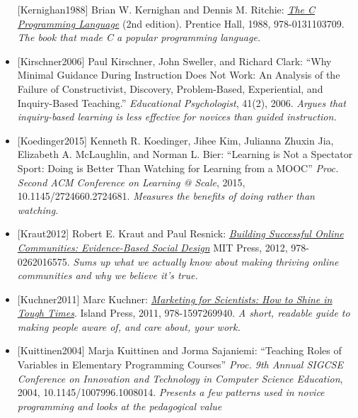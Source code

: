\documentclass[10pt,statementpaper]{memoir}
\begin{document}
\begin{itemize}
  \protect\hypertarget{kernighan-ritchie-c}{}{{[}Kernighan1988{]}} Brian
  W. Kernighan and Dennis M. Ritchie:
  \emph{\href{https://www.amazon.com/Programming-Language-Brian-W-Kernighan/dp/0131103628/}{The
  C Programming Language}} (2nd edition). Prentice Hall, 1988,
  978-0131103709. \emph{The book that made C a popular programming
  language.}
\item
  \protect\hypertarget{kirschner-minimal}{}{{[}Kirschner2006{]}} Paul
  Kirschner, John Sweller, and Richard Clark: ``Why Minimal Guidance
  During Instruction Does Not Work: An Analysis of the Failure of
  Constructivist, Discovery, Problem-Based, Experiential, and
  Inquiry-Based Teaching.'' \emph{Educational Psychologist}, 41(2),
  2006. \emph{Argues that inquiry-based learning is less effective for
  novices than guided instruction.}
\item
  \protect\hypertarget{koedinger-doing-watching}{}{{[}Koedinger2015{]}}
  Kenneth R. Koedinger, Jihee Kim, Julianna Zhuxin Jia, Elizabeth A.
  McLaughlin, and Norman L. Bier: ``Learning is Not a Spectator Sport:
  Doing is Better Than Watching for Learning from a MOOC'' \emph{Proc.
  Second ACM Conference on Learning @ Scale}, 2015,
  10.1145/2724660.2724681. \emph{Measures the benefits of doing rather
  than watching.}
\item
  \protect\hypertarget{kraut-resnick-online}{}{{[}Kraut2012{]}} {Robert
  E. Kraut and Paul Resnick:
  \emph{\href{https://www.amazon.com/Building-Successful-Online-Communities-Evidence-Based/dp/0262016575/}{Building
  Successful Online Communities: Evidence-Based Social Design}} MIT
  Press, 2012, 978-0262016575. \emph{Sums up what we actually know about
  making thriving online communities and why we believe it's true.}}
\item
  \protect\hypertarget{kuchner-marketing}{}{{[}Kuchner2011{]}} {Marc
  Kuchner:
  \emph{\href{https://www.amazon.com/Marketing-Scientists-Shine-Tough-Times/dp/1597269948/}{Marketing
  for Scientists: How to Shine in Tough Times}}. Island Press, 2011,
  978-1597269940. \emph{A short, readable guide to making people aware
  of, and care about, your work.}}
\item
  \protect\hypertarget{kuittinen-patterns}{}{{[}Kuittinen2004{]}} Marja
  Kuittinen and Jorma Sajaniemi: ``Teaching Roles of Variables in
  Elementary Programming Courses'' \emph{Proc. 9th Annual SIGCSE
  Conference on Innovation and Technology in Computer Science
  Education}, 2004, 10.1145/1007996.1008014. \emph{Presents a few
  patterns used in novice programming and looks at the pedagogical value
}
\end{itemize}
\end{document}
